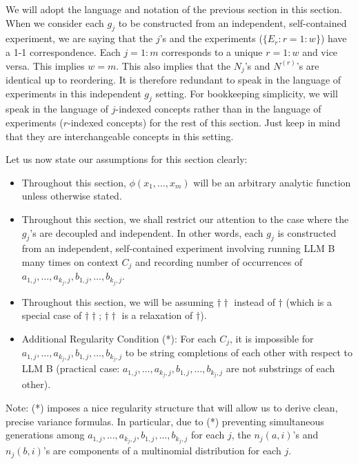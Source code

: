 \documentclass{article}
\begin{document}
We will adopt the language and notation of the previous section in this section. When we consider each $\displaystyle g_{j}$ to be constructed from an independent, self-contained experiment, we are saying that the $\displaystyle j$'s and the experiments ($\displaystyle \{E_{r} :r=1:w\}$) have a 1-1 correspondence. Each $\displaystyle j=1:m$ corresponds to a unique $\displaystyle r=1:w$ and vice versa. This implies $\displaystyle w=m$. This also implies that the $\displaystyle N_{j}$'s and $\displaystyle N^{\left( r\right)}$'s are identical up to reordering. It is therefore redundant to speak in the language of experiments in this independent $\displaystyle g_{j}$ setting. For bookkeeping simplicity, we will speak in the language of $\displaystyle j$-indexed concepts rather than in the language of experiments ($\displaystyle r$-indexed concepts) for the rest of this section. Just keep in mind that they are interchangeable concepts in this setting.



Let us now state our assumptions for this section clearly:
\begin{mdframed}
\begin{itemize}
    \item Throughout this section, $\phi(x_1, \dots, x_m)$ will be an arbitrary analytic function unless otherwise stated.
    \item Throughout this section, we shall restrict our attention to the case where the $g_j$'s are decoupled and independent. In other words, each $g_j$ is constructed from an independent, self-contained experiment involving running LLM B many times on context $C_j$ and recording number of occurrences of $a_{1,j}, \dots, a_{k_j,j}, b_{1,j}, \dots, b_{k_j,j}$.
    \item Throughout this section, we will be assuming $\dagger\dagger$ instead of $\dagger$ (which is a special case of $\dagger\dagger$; $\dagger\dagger$ is a relaxation of $\dagger$).
    \item Additional Regularity Condition (*): For each $C_j$, it is impossible for $a_{1,j}, \dots, a_{k_j,j}, b_{1,j}, \dots, b_{k_j,j}$ to be string completions of each other with respect to LLM B (practical case: $a_{1,j}, \dots, a_{k_j,j}, b_{1,j}, \dots, b_{k_j,j}$ are not substrings of each other).
\end{itemize}
\end{mdframed}
Note: (*) imposes a nice regularity structure that will allow us to derive clean, precise variance formulas. In particular, due to (*) preventing simultaneous generations among $\displaystyle a_{1,j} ,...,a_{k_{j} ,j} ,b_{1,j} ,...,b_{k_{j} ,j}$ for each $\displaystyle j$, the $\displaystyle n_{j}\left( a,i\right)$'s and $\displaystyle n_{j}\left( b,i\right)$'s are components of a multinomial distribution for each $\displaystyle j$.
\end{document}
